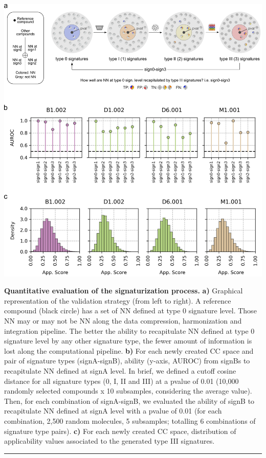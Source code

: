 \begin{Figure_modified}
  \centering
  \includegraphics[width=\linewidth]{figures/Protocols/Main/Fig3.eps}
  \caption{
    \textbf{Quantitative evaluation of the signaturization process.} 
    \textbf{a)} Graphical representation of the validation strategy (from left to right). A reference compound (black circle) has a set of NN defined at type 0 signature level. Those NN may or may not be NN along the data compression, harmonization and integration pipeline. The better the ability to recapitulate NN defined at type 0 signature level by any other signature type, the fewer amount of information is lost along the computational pipeline. 
    \textbf{b)} For each newly created CC space and pair of signature types (signA-signB), ability (y-axis, AUROC) from signBs to recapitulate NN defined at signA level. In brief, we defined a cutoff cosine distance for all signature types (0, I, II and III) at a pvalue of 0.01 (10,000 randomly selected compounds x 10 subsamples, considering the average value). Then, for each combination of signA-signB, we evaluated the ability of signB to recapitulate NN defined at signA level with a pvalue of 0.01 (for each combination, 2,500 random molecules, 5 subsamples; totalling 6 combinations of signature type pairs). 
    \textbf{c)} For each newly created CC space, distribution of applicability values associated to the generated type III signatures.
  }
  \vspace{-5mm}
  \rule[0ex]{\textwidth}{0.5pt}
  \vspace{-9mm}
  \label{Protocols_Fig3}
\end{Figure_modified}

